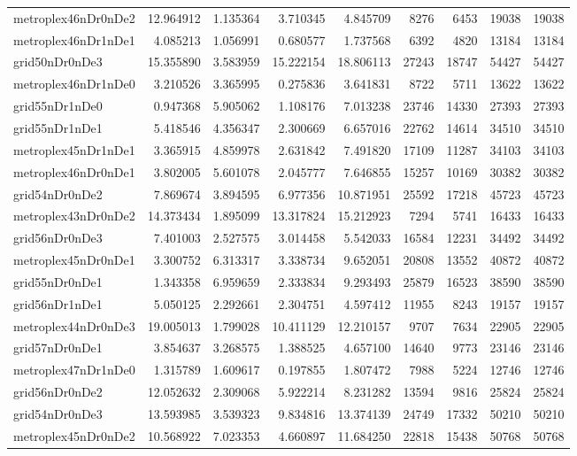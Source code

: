 \begin{longtable}{|l|r|r|r|r|r|r|r|r|}
metroplex46nDr0nDe2 & 12.964912 & 1.135364 & 3.710345 & 4.845709 & 8276 & 6453 & 19038 & 19038 \\
metroplex46nDr1nDe1 & 4.085213 & 1.056991 & 0.680577 & 1.737568 & 6392 & 4820 & 13184 & 13184 \\
grid50nDr0nDe3 & 15.355890 & 3.583959 & 15.222154 & 18.806113 & 27243 & 18747 & 54427 & 54427 \\
metroplex46nDr1nDe0 & 3.210526 & 3.365995 & 0.275836 & 3.641831 & 8722 & 5711 & 13622 & 13622 \\
grid55nDr1nDe0 & 0.947368 & 5.905062 & 1.108176 & 7.013238 & 23746 & 14330 & 27393 & 27393 \\
grid55nDr1nDe1 & 5.418546 & 4.356347 & 2.300669 & 6.657016 & 22762 & 14614 & 34510 & 34510 \\
metroplex45nDr1nDe1 & 3.365915 & 4.859978 & 2.631842 & 7.491820 & 17109 & 11287 & 34103 & 34103 \\
metroplex46nDr0nDe1 & 3.802005 & 5.601078 & 2.045777 & 7.646855 & 15257 & 10169 & 30382 & 30382 \\
grid54nDr0nDe2 & 7.869674 & 3.894595 & 6.977356 & 10.871951 & 25592 & 17218 & 45723 & 45723 \\
metroplex43nDr0nDe2 & 14.373434 & 1.895099 & 13.317824 & 15.212923 & 7294 & 5741 & 16433 & 16433 \\
grid56nDr0nDe3 & 7.401003 & 2.527575 & 3.014458 & 5.542033 & 16584 & 12231 & 34492 & 34492 \\
metroplex45nDr0nDe1 & 3.300752 & 6.313317 & 3.338734 & 9.652051 & 20808 & 13552 & 40872 & 40872 \\
grid55nDr0nDe1 & 1.343358 & 6.959659 & 2.333834 & 9.293493 & 25879 & 16523 & 38590 & 38590 \\
grid56nDr1nDe1 & 5.050125 & 2.292661 & 2.304751 & 4.597412 & 11955 & 8243 & 19157 & 19157 \\
metroplex44nDr0nDe3 & 19.005013 & 1.799028 & 10.411129 & 12.210157 & 9707 & 7634 & 22905 & 22905 \\
grid57nDr0nDe1 & 3.854637 & 3.268575 & 1.388525 & 4.657100 & 14640 & 9773 & 23146 & 23146 \\
metroplex47nDr1nDe0 & 1.315789 & 1.609617 & 0.197855 & 1.807472 & 7988 & 5224 & 12746 & 12746 \\
grid56nDr0nDe2 & 12.052632 & 2.309068 & 5.922214 & 8.231282 & 13594 & 9816 & 25824 & 25824 \\
grid54nDr0nDe3 & 13.593985 & 3.539323 & 9.834816 & 13.374139 & 24749 & 17332 & 50210 & 50210 \\
metroplex45nDr0nDe2 & 10.568922 & 7.023353 & 4.660897 & 11.684250 & 22818 & 15438 & 50768 & 50768 \\

\end{longtable}
